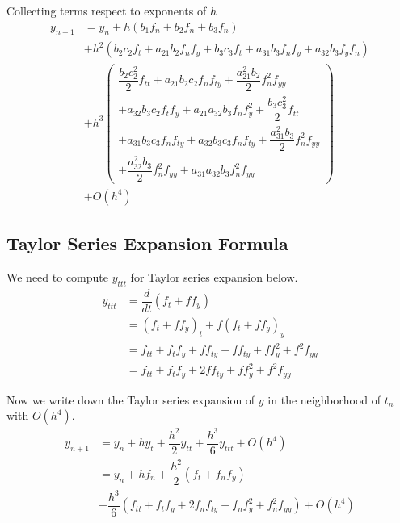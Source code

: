\documentclass[a4paper,oneside]{book}
\numberwithin{equation}{chapter}
\begin{document}
Collecting terms respect to exponents of $h$
\begin{align}
{{y_{n + 1}}} &= {{y_n}} + h\left( {{b_1}{f_n} + {b_2}{f_n} + {b_3}{f_n}} \right)\\
 &+ {h^2}\left( {{b_2}{c_2}{f_t} + {a_{21}}{b_2}{f_n}{f_y} + {b_3}{c_3}{f_t} + {a_{31}}{b_3}{f_n}{f_y} + {a_{32}}{b_3}{f_y}{f_n}} \right)\\
 &+ {h^3}\left( \begin{array}{l}
\dfrac{{{b_2}c_2^2}}{2}{f_{tt}} + {a_{21}}{b_2}{c_2}{f_n}{f_{ty}} + \dfrac{{a_{21}^2{b_2}}}{2}f_n^2{f_{yy}}\\
 + {a_{32}}{b_3}{c_2}{f_t}{f_y} + {a_{21}}{a_{32}}{b_3}{f_n}f_y^2 + \dfrac{{{b_3}c_3^2}}{2}{f_{tt}}\\
 + {a_{31}}{b_3}{c_3}{f_n}{f_{ty}} + {a_{32}}{b_3}{c_3}{f_n}{f_{ty}} + \dfrac{{a_{31}^2{b_3}}}{2}f_n^2{f_{yy}}\\
 + \dfrac{{a_{32}^2{b_3}}}{2}f_n^2{f_{yy}} + {a_{31}}{a_{32}}{b_3}f_n^2{f_{yy}}
\end{array} \right)\\
 &+ O\left( {{h^4}} \right)
 \label{3.27}
\end{align}
\subsection{Taylor Series Expansion Formula}
We need to compute $y_{ttt}$ for Taylor series expansion below.
\begin{align}
{y_{ttt}} &= \dfrac{d}{{dt}}\left( {{f_t} + f{f_y}} \right)\\
 &= {\left( {{f_t} + f{f_y}} \right)_t} + f{\left( {{f_t} + f{f_y}} \right)_y}\\
 &= {f_{tt}} + {f_t}{f_y} + f{f_{ty}} + f{f_{ty}} + ff_y^2 + {f^2}{f_{yy}}\\
 &= {f_{tt}} + {f_t}{f_y} + 2f{f_{ty}} + ff_y^2 + {f^2}{f_{yy}}
\end{align}

Now we write down the Taylor series expansion of $y$ in the neighborhood of $t_n$ with $O\left(h^4\right)$.
\begin{align}
 \label{3.34}
{{y_{n + 1}}} &= {{y_n}} + h{y_t} + \dfrac{{{h^2}}}{2}{y_{tt}} + \dfrac{{{h^3}}}{6}{y_{ttt}} + O\left( {{h^4}} \right)\\
 &= {{y_n}} + h{f_n} + \dfrac{{{h^2}}}{2}\left( {{f_t} + {f_n}{f_y}} \right)\\
 &+ \dfrac{{{h^3}}}{6}\left( {{f_{tt}} + {f_t}{f_y} + 2{f_n}{f_{ty}} + {f_n}f_y^2 + f_n^2{f_{yy}}} \right) + O\left( {{h^4}} \right)
 \label{3.36}
\end{align}
\end{document}
